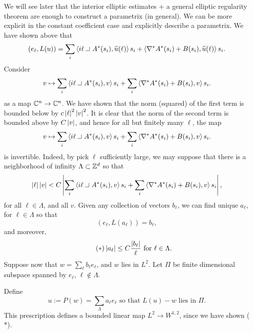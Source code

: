 \documentclass{amsart}
\begin{document}
  We will see later that the interior elliptic estimates + a general elliptic regularity theorem are enough to construct a parametrix (in general). We can be more explicit in the constant coefficient case and explicitly describe a parametrix. We have shown above that
  \begin{equation*}
    (e_{\ell},L(u))=\sum_{i}\ip{i\ell\intprod A^{*}(s_{i}),\hat{u}(\ell)}s_{i}+\ip{\nabla^{*}A^{*}(s_{i})+B(s_{i}),\hat{u}(\ell)}s_{i}.
  \end{equation*}
  Consider
  \begin{equation*}
    v\mapsto \sum_{i}\ip{i\ell\intprod A^{*}(s_{i}),v}s_{i}+\sum_{i}\ip{\nabla^{*}A^{*}(s_{i})+B(s_{i}),v}s_{i}.
  \end{equation*}
  as a map $\mathbb{C}^{n}\to \mathbb{C}^{n}$. We have shown that the norm (squared) of the first term is bounded below by $c\left|\ell\right|^{2}\left|v\right|^{2}$. It is clear that the norm of the second term is bounded above by $C\left|v\right|$, and hence for all but finitely many $\ell$, the map
  \begin{equation*}
    v\mapsto \sum_{i}\ip{i\ell\intprod A^{*}(s_{i}),v}s_{i}+\sum_{i}\ip{\nabla^{*}A^{*}(s_{i})+B(s_{i}),v}s_{i}.
  \end{equation*}
  is invertible. Indeed, by pick $\ell$ sufficiently large, we may suppose that there is a neighborhood of infinity $\Lambda\subset \mathbb{Z}^{d}$ so that
  \begin{equation*} 
    \abs{\ell}\abs{v}<C\abs{\sum_{i}\ip{i\ell\intprod A^{*}(s_{i}),v}s_{i}+\sum_{i}\ip{\nabla^{*}A^{*}(s_{i})+B(s_{i}),v}s_{i}},
  \end{equation*}
  for all $\ell\in \Lambda$, and all $v$. Given any collection of vectors $b_{\ell}$, we can find unique $a_{\ell}$, for $\ell\in \Lambda$ so that
  \begin{equation*}
    (e_{\ell},L(a_{\ell}))=b_{\ell},
  \end{equation*}
  and moreover,
  \begin{equation*}\tag{$\ast$}
    \left|a_{\ell}\right|\le C\frac{\left|b_{\ell}\right|}{\ell}\text{ for $\ell\in \Lambda$}.
  \end{equation*}
  Suppose now that $w=\sum_{\ell}b_{\ell}e_{\ell}$, and $w$ lies in $L^{2}$. Let $\Pi$ be finite dimensional subspace spanned by $e_{\ell}$, $\ell\not\in \Lambda$.

  Define
  \begin{equation*}
    u:=P(w)=\sum_{\Lambda}a_{\ell}e_{\ell}\text{ so that }L(u)-w\text{ lies in $\Pi$}.
  \end{equation*}
  This prescription defines a bounded linear map $L^{2}\to W^{1,2}$, since we have shown ($\ast$).
\end{document}
